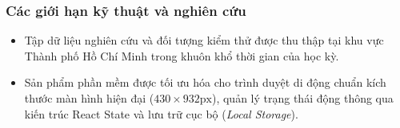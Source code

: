 \subsubsection{Các giới hạn kỹ thuật và nghiên cứu}
\begin{itemize}
    \item Tập dữ liệu nghiên cứu và đối tượng kiểm thử được thu thập tại khu vực Thành phố Hồ Chí Minh trong khuôn khổ thời gian của học kỳ.
    \item Sản phẩm phần mềm được tối ưu hóa cho trình duyệt di động chuẩn kích thước màn hình hiện đại ($430 \times 932\text{px}$), quản lý trạng thái động thông qua kiến trúc React State và lưu trữ cục bộ (\textit{Local Storage}).
\end{itemize}
